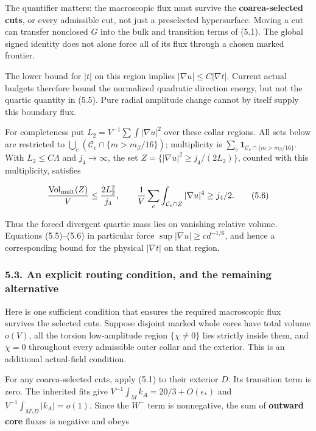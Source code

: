 \documentclass[
  11pt,
]{article}
\begin{document}
The quantifier matters: the macroscopic flux must survive the
\textbf{coarea-selected cuts}, or every admissible cut, not just a
preselected hypersurface. Moving a cut can transfer nonclosed \(G\) into
the bulk and transition terms of (5.1). The global signed identity does
not alone force all of its flux through a chosen marked frontier.

The lower bound for \(|t|\) on this region implies
\(|\nabla u|\le C|\nabla t|\). Current actual budgets therefore bound
the normalized quadratic direction energy, but not the quartic quantity
in (5.5). Pure radial amplitude change cannot by itself supply this
boundary flux.

For completeness put \(L_2=V^{-1}\sum\int|\nabla u|^2\) over these
collar regions. All sets below are restricted to
\(\bigcup_e(\mathcal C_e\cap\{m>m_\beta/16\})\); multiplicity is
\(\sum_e\mathbf1_{\mathcal C_e\cap\{m>m_\beta/16\}}\). With
\(L_2\le C\Lambda\) and \(j_4\to\infty\), the set
\(Z=\{|\nabla u|^2\ge j_4/(2L_2)\}\), counted with this multiplicity,
satisfies

\[
 \frac{\operatorname{Vol}_{\rm mult}(Z)}V
        \le\frac{2L_2^2}{j_4},\qquad
 \frac1V\sum_e\int_{\mathcal C_e\cap Z}|\nabla u|^4\ge j_4/2.
 \tag{5.6}
\]

Thus the forced divergent quartic mass lies on vanishing relative
volume. Equations (5.5)--(5.6) in particular force
\(\sup|\nabla u|\ge c d^{-1/6}\), and hence a corresponding bound for
the physical \(|\nabla t|\) on that region.

\hypertarget{an-explicit-routing-condition-and-the-remaining-alternative}{%
\subsubsection{5.3. An explicit routing condition, and the remaining
alternative}\label{an-explicit-routing-condition-and-the-remaining-alternative}}

Here is one sufficient condition that ensures the required macroscopic
flux survives the selected cuts. Suppose disjoint marked whole cores
have total volume \(o(V)\), all the torsion low-amplitude region
\(\{\chi\ne0\}\) lies strictly inside them, and \(\chi=0\) throughout
every admissible outer collar and the exterior. This is an additional
actual-field condition.

For any coarea-selected cuts, apply (5.1) to their exterior \(D\). Its
transition term is zero. The inherited fits give
\(V^{-1}\int_M k_A=20/3+O(\epsilon_*)\) and
\(V^{-1}\int_{M\setminus D}|k_A|=o(1)\). Since the \(W^-\) term is
nonnegative, the sum of \textbf{outward core} fluxes is negative and
obeys
\end{document}
